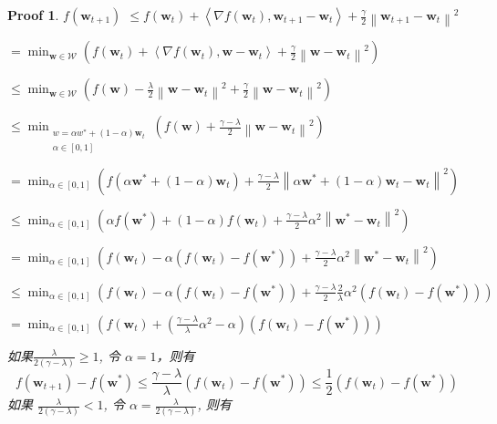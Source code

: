 \documentclass[a4paper,UTF8]{article}
\numberwithin{equation}{section}
\newtheorem*{myProof}{Proof}
\begin{document}
\begin{myProof}
		$f\left(\boldsymbol{w}_{t+1}\right)$
		$\leqslant f\left(\boldsymbol{w}_{t}\right)+\left\langle\nabla f\left(\boldsymbol{w}_{t}\right), \boldsymbol{w}_{t+1}-\boldsymbol{w}_{t}\right\rangle+\frac{\gamma}{2}\left\|\boldsymbol{w}_{t+1}-\boldsymbol{w}_{t}\right\|^{2}$
		
		$=\min _{\boldsymbol{w} \in \mathcal{W}}\left(f\left(\boldsymbol{w}_{t}\right)+\left\langle\nabla f\left(\boldsymbol{w}_{t}\right), \boldsymbol{w}-\boldsymbol{w}_{t}\right\rangle+\frac{\gamma}{2}\left\|\boldsymbol{w}-\boldsymbol{w}_{t}\right\|^{2}\right)$
		
		$\leqslant \min _{\boldsymbol{w} \in \mathcal{W}}\left(f(\boldsymbol{w})-\frac{\lambda}{2}\left\|\boldsymbol{w}-\boldsymbol{w}_{t}\right\|^{2}+\frac{\gamma}{2}\left\|\boldsymbol{w}-\boldsymbol{w}_{t}\right\|^{2}\right)$
		
		$\leqslant \min _{\substack{w=\alpha w^{*}+(1-\alpha) \boldsymbol{w}_{t} \\ \alpha \in[0,1]}}\left(f(\boldsymbol{w})+\frac{\gamma-\lambda}{2}\left\|\boldsymbol{w}-\boldsymbol{w}_{t}\right\|^{2}\right)$
		
		$=\min _{\alpha \in[0,1]}\left(f\left(\alpha \boldsymbol{w}^{*}+(1-\alpha) \boldsymbol{w}_{t}\right)+\frac{\gamma-\lambda}{2}\left\|\alpha \boldsymbol{w}^{*}+(1-\alpha) \boldsymbol{w}_{t}-\boldsymbol{w}_{t}\right\|^{2}\right)$
		
		$\leqslant \min _{\alpha \in[0,1]}\left(\alpha f\left(\boldsymbol{w}^{*}\right)+(1-\alpha) f\left(\boldsymbol{w}_{t}\right)+\frac{\gamma-\lambda}{2} \alpha^{2}\left\|\boldsymbol{w}^{*}-\boldsymbol{w}_{t}\right\|^{2}\right)$
		
		$=\min _{\alpha \in[0,1]}\left(f\left(\boldsymbol{w}_{t}\right)-\alpha\left(f\left(\boldsymbol{w}_{t}\right)-f\left(\boldsymbol{w}^{*}\right)\right)+\frac{\gamma-\lambda}{2} \alpha^{2}\left\|\boldsymbol{w}^{*}-\boldsymbol{w}_{t}\right\|^{2}\right)$
		
		$\leqslant \min _{\alpha \in[0,1]}\left(f\left(\boldsymbol{w}_{t}\right)-\alpha\left(f\left(\boldsymbol{w}_{t}\right)-f\left(\boldsymbol{w}^{*}\right)\right)+\frac{\gamma-\lambda}{2} \frac{2}{\lambda} \alpha^{2}\left(f\left(\boldsymbol{w}_{t}\right)-f\left(\boldsymbol{w}^{*}\right)\right)\right)$
		
		$=\min _{\alpha \in[0,1]}\left(f\left(\boldsymbol{w}_{t}\right)+\left(\frac{\gamma-\lambda}{\lambda} \alpha^{2}-\alpha\right)\left(f\left(\boldsymbol{w}_{t}\right)-f\left(\boldsymbol{w}^{*}\right)\right)\right)$
		
		如果$\frac{\lambda}{2(\gamma-\lambda)} \geqslant 1$, 令 $\alpha=1$，则有$$
		f\left(\boldsymbol{w}_{t+1}\right)-f\left(\boldsymbol{w}^{*}\right) \leqslant \frac{\gamma-\lambda}{\lambda}\left(f\left(\boldsymbol{w}_{t}\right)-f\left(\boldsymbol{w}^{*}\right)\right) \leqslant \frac{1}{2}\left(f\left(\boldsymbol{w}_{t}\right)-f\left(\boldsymbol{w}^{*}\right)\right)
		$$
		如果 $\frac{\lambda}{2(\gamma-\lambda)}<1$, 令 $\alpha=\frac{\lambda}{2(\gamma-\lambda)}$, 则有
		

\end{myProof}
\end{document}
